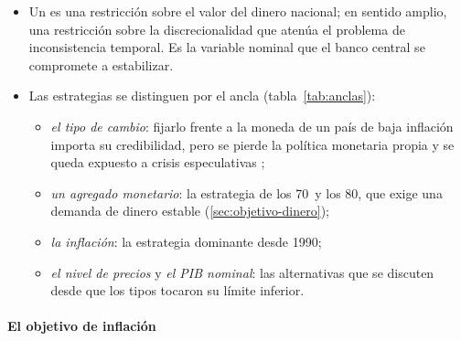 \documentclass[11pt]{article}
\begin{document}
\begin{itemize}
\item Un  es una restricción sobre el valor del dinero nacional; en sentido amplio, una restricción sobre la discrecionalidad que atenúa el problema de inconsistencia temporal\nocite{Mishkin1999International}. Es la variable nominal que el banco central se compromete a estabilizar.
\item Las estrategias se distinguen por el ancla (tabla~\ref{tab:anclas}):
  \begin{itemize}
  \item \emph{el tipo de cambio}: fijarlo frente a la moneda de un país de baja inflación importa su credibilidad, pero se pierde la política monetaria propia y se queda expuesto a crisis especulativas ;
  \item \emph{un agregado monetario}: la estrategia de los 70~y los 80, que exige una demanda de dinero estable (\ref{sec:objetivo-dinero});
  \item \emph{la inflación}: la estrategia dominante desde 1990;
  \item \emph{el nivel de precios} y \emph{el PIB nominal}: las alternativas que se discuten desde que los tipos tocaron su límite inferior.
  \end{itemize}
\end{itemize}

\paragraph{El objetivo de inflación}
\end{document}
